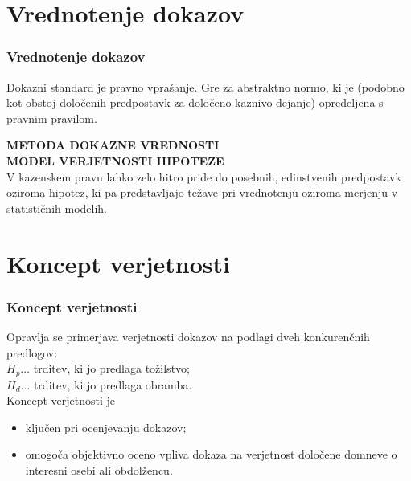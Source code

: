 \documentclass{beamer}
\begin{document}
\section{Vrednotenje dokazov}
\begin{frame}
    \frametitle{Vrednotenje dokazov}
    \begin{block}{Dokazni standard}
        je pravno vprašanje. Gre za abstraktno normo, ki je (podobno kot obstoj določenih predpostavk za 
        določeno kaznivo dejanje) opredeljena s pravnim pravilom.
    \end{block}\vspace{3mm}
    \textbf{METODA DOKAZNE VREDNOSTI}\\
    \textbf{MODEL VERJETNOSTI HIPOTEZE}\\ \vspace{3mm}
    V kazenskem pravu lahko zelo hitro pride do posebnih, edinstvenih predpostavk oziroma hipotez, ki pa predstavljajo težave pri vrednotenju oziroma merjenju v statističnih modelih. 
\end{frame}


\section{Koncept verjetnosti}

\begin{frame}
    \frametitle{Koncept verjetnosti}
    Opravlja se primerjava verjetnosti dokazov na podlagi dveh konkurenčnih predlogov:\\
    $H_p \dots$ trditev, ki jo predlaga tožilstvo;\\
    $H_d \dots$ trditev, ki jo predlaga obramba.\\ \vspace{5mm}
    Koncept verjetnosti je
    \begin{itemize}
        \item ključen pri ocenjevanju dokazov;
        \item omogoča objektivno oceno vpliva dokaza na verjetnost določene domneve o interesni osebi ali obdolžencu.
    \end{itemize}
\end{frame}
\end{document}
